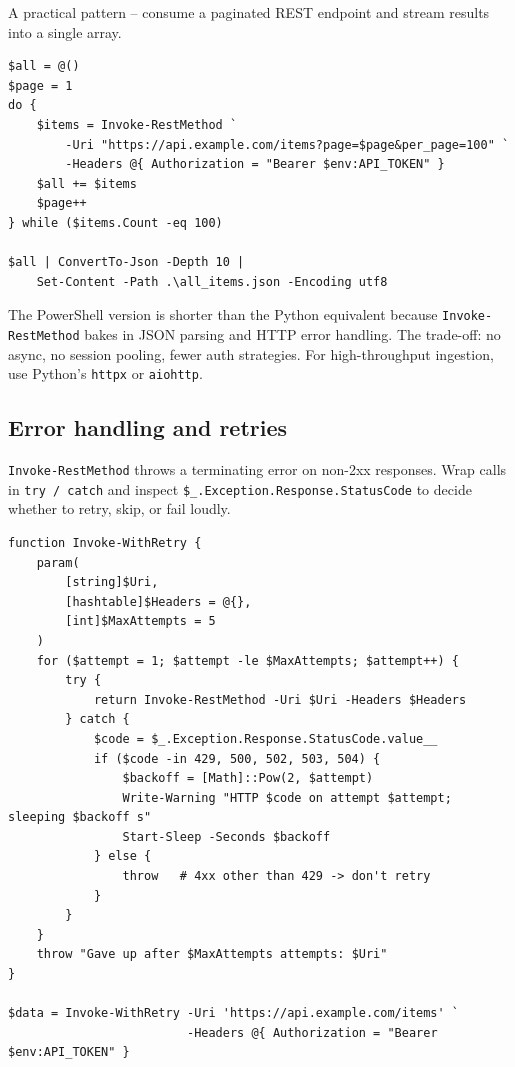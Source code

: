 \documentclass[11pt,a4paper]{article}
\newcommand{\cmd}[1]{\texttt{\textcolor{pwshKw}{#1}}}
\begin{document}
A practical pattern -- consume a paginated REST endpoint and stream
results into a single array.

\begin{lstlisting}[style=pwshstyle]
$all = @()
$page = 1
do {
    $items = Invoke-RestMethod `
        -Uri "https://api.example.com/items?page=$page&per_page=100" `
        -Headers @{ Authorization = "Bearer $env:API_TOKEN" }
    $all += $items
    $page++
} while ($items.Count -eq 100)

$all | ConvertTo-Json -Depth 10 |
    Set-Content -Path .\all_items.json -Encoding utf8
\end{lstlisting}

\begin{compare}
The PowerShell version is shorter than the Python equivalent because
\cmd{Invoke-RestMethod} bakes in JSON parsing and HTTP error handling.
The trade-off: no async, no session pooling, fewer auth strategies.
For high-throughput ingestion, use Python's \texttt{httpx} or
\texttt{aiohttp}.
\end{compare}

\subsection*{Error handling and retries}

\cmd{Invoke-RestMethod} throws a terminating error on non-2xx
responses. Wrap calls in \texttt{try / catch} and inspect
\texttt{\$\_.Exception.Response.StatusCode} to decide whether to
retry, skip, or fail loudly.

\begin{lstlisting}[style=pwshstyle]
function Invoke-WithRetry {
    param(
        [string]$Uri,
        [hashtable]$Headers = @{},
        [int]$MaxAttempts = 5
    )
    for ($attempt = 1; $attempt -le $MaxAttempts; $attempt++) {
        try {
            return Invoke-RestMethod -Uri $Uri -Headers $Headers
        } catch {
            $code = $_.Exception.Response.StatusCode.value__
            if ($code -in 429, 500, 502, 503, 504) {
                $backoff = [Math]::Pow(2, $attempt)
                Write-Warning "HTTP $code on attempt $attempt; sleeping $backoff s"
                Start-Sleep -Seconds $backoff
            } else {
                throw   # 4xx other than 429 -> don't retry
            }
        }
    }
    throw "Gave up after $MaxAttempts attempts: $Uri"
}

$data = Invoke-WithRetry -Uri 'https://api.example.com/items' `
                         -Headers @{ Authorization = "Bearer $env:API_TOKEN" }
\end{lstlisting}
\end{document}
